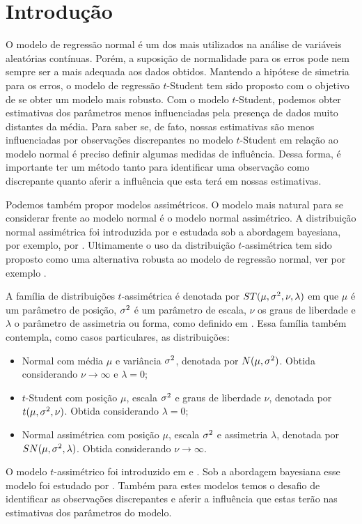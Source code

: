 \chapter{Introdução}
\label{cap:introducao}
O modelo de regressão normal é um dos mais utilizados na análise de variáveis aleatórias contínuas. Porém, a suposição de normalidade para os erros pode nem sempre ser a mais adequada aos dados obtidos. Mantendo a hipótese de simetria para os erros, o modelo de regressão $t$-Student tem sido proposto com o objetivo de se obter um modelo mais robusto. Com o modelo $t$-Student, podemos obter estimativas dos parâmetros menos influenciadas pela presença de dados muito distantes da média. Para saber se, de fato, nossas estimativas são menos influenciadas por observações discrepantes no modelo $t$-Student em relação ao modelo normal é preciso definir algumas medidas de influência. Dessa forma, é importante ter um método tanto para identificar uma observação como discrepante quanto aferir a influência que esta terá em nossas estimativas.

Podemos também propor modelos assimétricos. O modelo mais natural para se considerar frente ao modelo normal é o modelo normal assimétrico. A distribuição normal assimétrica foi introduzida por \citet{Azzalini1985} e estudada sob a abordagem bayesiana, por exemplo, por \citet{Bayes2005:MSc}. Ultimamente o uso da distribuição $t$-assimétrica tem sido proposto como uma alternativa robusta ao modelo de regressão normal, ver por exemplo \citet{Azzalini2008}.

A família de distribuições $t$-assimétrica é denotada por $ST(\mu,\sigma^2,\nu,\lambda)$ em que $\mu$ é um parâmetro de posição, $\sigma^2$ é um parâmetro de escala, $\nu$ os graus de liberdade e $\lambda$ o parâmetro de assimetria ou forma, como definido em \citet{Godoi2007:MSc}. Essa família também contempla, como casos particulares, as distribuições:
\begin{itemize}
\item Normal com média $\mu$ e variância $\sigma^2$, denotada por $N(\mu,\sigma^2)$. Obtida considerando $\nu \to \infty$ e $\lambda=0$;
\item $t$-Student com posição $\mu$, escala $\sigma^2$ e graus de liberdade $\nu$, denotada por $t(\mu,\sigma^2,\nu)$. Obtida considerando $\lambda=0$;
\item Normal assimétrica com posição $\mu$, escala $\sigma^2$ e assimetria $\lambda$, denotada por \linebreak $SN(\mu,\sigma^2,\lambda)$. Obtida considerando $\nu\to\infty$.
\end{itemize}
O modelo $t$-assimétrico foi introduzido em \citet{BrancoDey2001} e \citet{Azzalini2003}. Sob a abordagem bayesiana esse modelo foi estudado por \citet{Godoi2007:MSc}. Também para estes modelos temos o desafio de identificar as observações discrepantes e aferir a influência que estas terão nas estimativas dos parâmetros do modelo.

